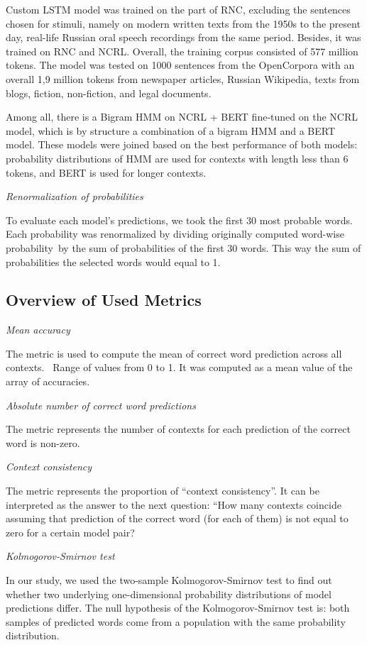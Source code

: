 \documentclass[a4paper]{article}
\newcommand{\head}[1]{\vspace{0.5em}\emph{#1}\vspace{0.25em}}
\begin{document}
Custom LSTM model was trained on the part of RNC, excluding the sentences chosen for stimuli, namely on modern written texts from the 1950s to the present day, real-life Russian oral speech recordings from the same period. Besides, it was trained on RNC and NCRL. Overall, the training corpus consisted of 577 million tokens. The model was tested on 1000 sentences from the OpenCorpora \cite{bocharov:2011} with an overall 1,9 million tokens from newspaper articles, Russian Wikipedia, texts from blogs, fiction, non-fiction, and legal documents. 

Among all, there is a Bigram HMM on NCRL + BERT fine-tuned on the NCRL model, which is by structure a combination of a bigram HMM and a BERT model. These models were joined based on the best performance of both models: probability distributions of HMM are used for contexts with length less than 6 tokens, and BERT is used for longer contexts. 

\head{Renormalization of probabilities}

To evaluate each model’s predictions, we took the first 30 most probable words. Each probability was renormalized by dividing originally computed word-wise probability by the sum of probabilities of the first 30 words. This way the sum of probabilities the selected words would equal to 1.

\subsection{Overview of Used Metrics}

\head{Mean accuracy}

The metric is used to compute the mean of correct word prediction across all contexts.  Range of values from 0 to 1. It was computed as a mean value of the array of accuracies.

\head{Absolute number of correct word predictions}

The metric represents the number of contexts for each prediction of the correct word is non-zero. 

\head{Context consistency}

The metric represents the proportion of “context consistency”. It can be interpreted as the answer to the next question: “How many contexts coincide assuming that prediction of the correct word (for each of them) is not equal to zero for a certain model pair?

\head{Kolmogorov-Smirnov test}

In our study, we used the two-sample Kolmogorov-Smirnov test to find out whether two underlying one-dimensional probability distributions of model predictions differ. The null hypothesis of the Kolmogorov-Smirnov test is: both samples of predicted words come from a population with the same probability distribution. 
\end{document}
